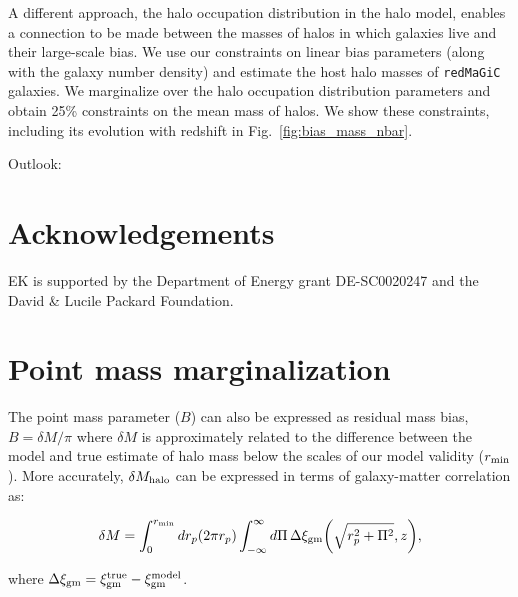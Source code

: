 \documentclass[fleqn,usenatbib]{mnras}
\newcommand{\redmagic}{\texttt{redMaGiC} }
\begin{document}
A different approach, the halo occupation distribution in the halo model, enables a connection to be made between the masses of halos in which galaxies live and their large-scale bias. We use our constraints on linear bias parameters (along with the galaxy number density) and estimate the host halo masses of \redmagic galaxies. We marginalize over the halo occupation distribution parameters and obtain 25\% constraints on the mean mass of halos. We show these constraints, including its evolution with redshift in Fig.~\ref{fig:bias_mass_nbar}.

Outlook: 


\section*{Acknowledgements}
EK is supported by the Department of Energy grant DE-SC0020247 and the David \& Lucile Packard Foundation.











\appendix



\section{Point mass marginalization}
\label{app:pm}
The point mass parameter ($B$) can also be expressed as residual mass bias, $B = \delta M/\pi$ where $\delta M$ is approximately related to the difference between the model and true estimate of halo mass below the scales of our model validity ($r_{\rm min}$). More accurately, $\delta M_{\rm halo}$ can be expressed in terms of galaxy-matter correlation as:
\begin{linenomath*}
\begin{equation}
\label{eq:pm_halo}
    \delta M = \int_{0}^{r_{\rm min}} dr_p (2\pi r_p) \int_{-\infty}^{\infty} d\Pi \, \Delta \xi_{\rm gm}\bigg(\sqrt{r_p^2 + \Pi^2}, z \bigg), 
\end{equation}
\end{linenomath*}
where $\Delta \xi_{\rm gm} = \xi^{\rm true}_{\rm gm} - \xi^{\rm model}_{\rm gm}$.
\end{document}
